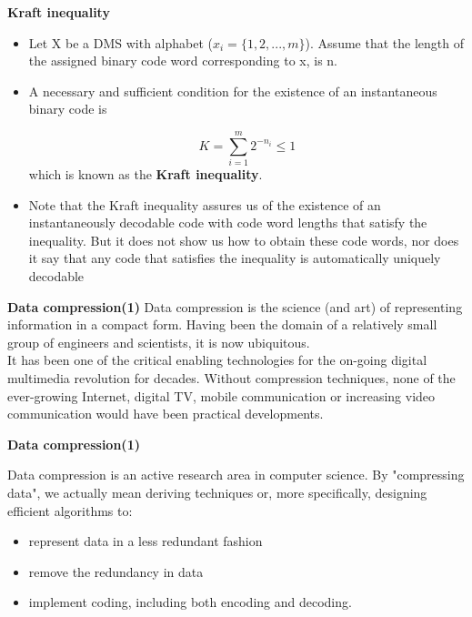 \noindent \textbf{ Kraft inequality}
\begin{itemize}
\item Let X be a DMS with alphabet ($x _i = \{1, 2, . . . ,m\}$). Assume that the length of the assigned binary
code word corresponding to x, is n.
\item A necessary and sufficient condition for the existence of an instantaneous binary code is

 \[ K = \sum^{m}_{i=1}2^{-n_i} \leq 1 \]
which is known as the \textbf{Kraft inequality}.
\item Note that the Kraft inequality assures us of the existence of an instantaneously decodable code
with code word lengths that satisfy the inequality. But it does not show us how to obtain these code
words, nor does it say that any code that satisfies the inequality is automatically uniquely decodable
\end{itemize}






{
\noindent \textbf{Data compression(1)}
Data compression is the science (and art) of representing information in a compact form. Having been the domain of a relatively small group of engineers and scientists, it is now ubiquitous. \\ \bigskip It has been one of the critical enabling technologies for the on-going digital multimedia revolution for decades. Without compression techniques, none of the ever-growing Internet, digital TV, mobile communication or increasing video communication would have been practical developments. \\ \bigskip
}
{
\noindent \textbf{Data compression(1)}

Data compression is an active research area in computer science. By "compressing data", we actually mean deriving techniques or, more specifically, designing efficient algorithms to:

\begin{itemize}
\item represent data in a less redundant fashion
\item remove the redundancy in data
\item implement coding, including both encoding and decoding.
\end{itemize}

}





